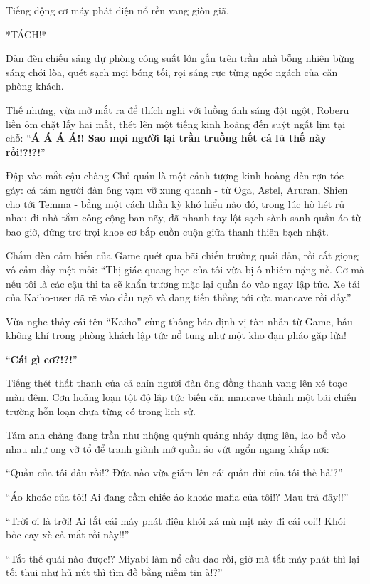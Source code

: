 \documentclass[../main.tex]{subfiles}
\begin{document}
Tiếng động cơ máy phát điện nổ rền vang giòn giã.

*TÁCH!*

Dàn đèn chiếu sáng dự phòng công suất lớn gắn trên trần nhà bỗng nhiên bừng sáng chói lòa, quét sạch mọi bóng tối, rọi sáng rực từng ngóc ngách của căn phòng khách.


Thế nhưng, vừa mở mắt ra để thích nghi với luồng ánh sáng đột ngột, Roberu liền ôm chặt lấy hai mắt, thét lên một tiếng kinh hoàng đến suýt ngất lịm tại chỗ: ``\textbf{Á Á Á Á!! Sao mọi người lại trần truồng hết cả lũ thế này rồi!?!?!}''

Đập vào mắt cậu chàng Chủ quán là một cảnh tượng kinh hoàng đến rợn tóc gáy: cả tám người đàn ông vạm vỡ xung quanh - từ Oga, Astel, Aruran, Shien cho tới Temma - bằng một cách thần kỳ khó hiểu nào đó, trong lúc hò hét rủ nhau đi nhà tắm công cộng ban nãy, đã nhanh tay lột sạch sành sanh quần áo từ bao giờ, đứng trơ trọi khoe cơ bắp cuồn cuộn giữa thanh thiên bạch nhật.

Chấm đèn cảm biến của Game quét qua bãi chiến trường quái đản, rồi cất giọng vô cảm đầy mệt mỏi: ``Thị giác quang học của tôi vừa bị ô nhiễm nặng nề. Cơ mà nếu tôi là các cậu thì ta sẽ khẩn trương mặc lại quần áo vào ngay lập tức. Xe tải của Kaiho-user đã rẽ vào đầu ngõ và đang tiến thẳng tới cửa mancave rồi đấy.''

Vừa nghe thấy cái tên ``Kaiho'' cùng thông báo định vị tàn nhẫn từ Game, bầu không khí trong phòng khách lập tức nổ tung như một kho đạn pháo gặp lửa!

``\textbf{Cái gì cơ?!?!}''

Tiếng thét thất thanh của cả chín người đàn ông đồng thanh vang lên xé toạc màn đêm. Cơn hoảng loạn tột độ lập tức biến căn mancave thành một bãi chiến trường hỗn loạn chưa từng có trong lịch sử.

Tám anh chàng đang trần như nhộng quýnh quáng nhảy dựng lên, lao bổ vào nhau như ong vỡ tổ để tranh giành mớ quần áo vứt ngổn ngang khắp nơi:

``Quần của tôi đâu rồi!? Đứa nào vừa giẫm lên cái quần đùi của tôi thế hả!?''

``Áo khoác của tôi! Ai đang cầm chiếc áo khoác mafia của tôi!? Mau trả đây!!''

``Trời ơi là trời! Ai tắt cái máy phát điện khói xả mù mịt này đi cái coi!! Khói bốc cay xè cả mắt rồi này!!''

``Tắt thế quái nào được!? Miyabi làm nổ cầu dao rồi, giờ mà tắt máy phát thì lại tối thui như hũ nút thì tìm đồ bằng niềm tin à!?''
\end{document}
